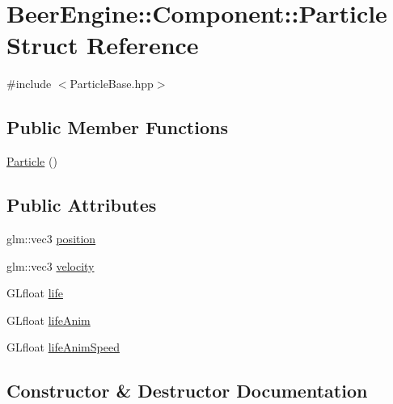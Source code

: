 \hypertarget{struct_beer_engine_1_1_component_1_1_particle}{}\section{Beer\+Engine\+:\+:Component\+:\+:Particle Struct Reference}
\label{struct_beer_engine_1_1_component_1_1_particle}


{\ttfamily \#include $<$Particle\+Base.\+hpp$>$}

\subsection*{Public Member Functions}
\begin{DoxyCompactItemize}
\item 
\mbox{\hyperlink{struct_beer_engine_1_1_component_1_1_particle_a5cda26648ed47e1ef726a07437ac8530}{Particle}} ()
\end{DoxyCompactItemize}
\subsection*{Public Attributes}
\begin{DoxyCompactItemize}
\item 
glm\+::vec3 \mbox{\hyperlink{struct_beer_engine_1_1_component_1_1_particle_a23d67ee03aeae7d36af443d4a5073fc9}{position}}
\item 
glm\+::vec3 \mbox{\hyperlink{struct_beer_engine_1_1_component_1_1_particle_ac9197940d7cd2b4b34fb031b81f7b766}{velocity}}
\item 
G\+Lfloat \mbox{\hyperlink{struct_beer_engine_1_1_component_1_1_particle_a34f41da652f2fd8e050b53b4cb6fc48c}{life}}
\item 
G\+Lfloat \mbox{\hyperlink{struct_beer_engine_1_1_component_1_1_particle_aa253bdeacf5354979f7ebf0a3d57e5ee}{life\+Anim}}
\item 
G\+Lfloat \mbox{\hyperlink{struct_beer_engine_1_1_component_1_1_particle_a84eaed620a72fd7c09f5ca4e97d5e96e}{life\+Anim\+Speed}}
\end{DoxyCompactItemize}


\subsection{Constructor \& Destructor Documentation}
\mbox{\label{struct_beer_engine_1_1_component_1_1_particle_a5cda26648ed47e1ef726a07437ac8530}} 
